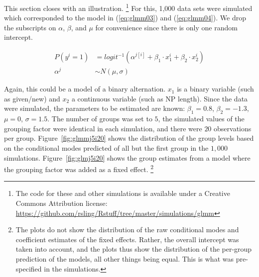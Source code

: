 \documentclass[a4paper,12pt]{article}
\begin{document}
This section closes with an illustration.%
\footnote{The code for these and other simulations is available under a Creative Commons Attribution license: \url{https://github.com/rsling/Rstuff/tree/master/simulations/glmm}}
For this, 1,000 data sets were simulated which corresponded to the model in (\ref{eq:glmm03}) and (\ref{eq:glmm04}).
We drop the subscripts on $\alpha$, $\beta$, and $\mu$ for convenience since there is only one random intercept.

\begin{align}
  P(y^i=1) & =logit^{-1}(\alpha^{j[i]}+\beta_1\cdot x_1^i+\beta_2\cdot x_2^i)
  \label{eq:glmm03}\\
  \alpha^j & \sim N(\mu, \sigma)\label{eq:glmm04}
\end{align}

Again, this could be a model of a binary alternation.
$x_1$ is a binary variable (such as given\slash new) and $x_2$ a continuous variable (such as NP length).
Since the data were simulated, the parameters to be estimated are known: $\beta_1=0.8$, $\beta_2=-1.3$, $\mu=0$, $\sigma=1.5$.
The number of groups was set to $5$, the simulated values of the grouping factor were identical in each simulation, and there were $20$ observations per group.
Figure~\ref{fig:glmmj5i20} shows the distribution of the group levels based on the conditional modes predicted of all but the first group in the $1,000$ simulations.
Figure~\ref{fig:glmj5i20} shows the group estimates from a model where the grouping factor was added as a fixed effect.%
\footnote{The plots do not show the distribution of the raw conditional modes and coefficient estimates of the fixed effects.
Rather, the overall intercept was taken into account, and the plots thus show the distribution of the per-group prediction of the models, all other things being equal.
This is what was pre-specified in the simulations.}
\end{document}
